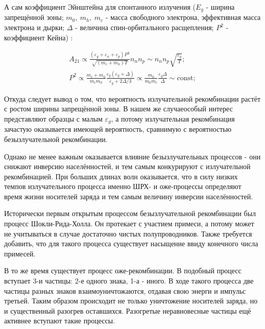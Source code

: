 \documentclass[../main.tex]{subfiles}
\begin{document}
    А сам коэффициент Эйнштейна для спонтанного излучения 
    ($E_g$ - ширина запрещённой зоны; $m_0,~m_h,~m_c$ - масса свободного электрона,
    эффективная масса электрона и дырки; $\Delta$ - величина спин-орбитального 
    расщепления; $P^2$ - коэффициент Кейна) \cite{Asryan:IOP:2005}: 

    \begin{equation*}
        \begin{array}{l}
            A_{21} \propto \frac{(\varepsilon_g + \varepsilon_n + \varepsilon_p) P^2}
                {\sqrt{(m_c + m_h)T}} n_n n_p \sim n_n n_p \sqrt{\frac{\varepsilon_g}{T}} ;\\
            P^2 \propto \frac{m_c + m_0}{m_c m_0} \frac{\varepsilon_g(\varepsilon_g + \Delta)}
                {\varepsilon_g + 2 \Delta / 3} \propto \frac{m_0}{m_0 m_c} \frac{\varepsilon_g \Delta}{\Delta} \sim \text{const};
        \end{array}
    \end{equation*} 

    Откуда следует вывод о том, что вероятность излучательной рекомбинации растёт
    с ростом ширины запрещённой зоны. В нашем же случаеособый интерес представляют
    образцы с малым $\varepsilon_g$, а потому излучательная рекомбинация зачастую оказывается
    имеющей вероятность, сравнимую с вероятностью безызлучательной рекомбинации.

    Однако не менее важным оказывается влияние безызлучательных процессов - они снижают
    инверсию населённостей, и тем самым конкурируют с излучательной рекомбинацией. При больших 
    длинах волн оказывается, что в силу низких темпов излучательного процесса именно ШРХ- и 
    оже-процессы определяют время жизни носителей заряда и тем самым величину инверсии населённостей.

    Исторически первым открытым процессом безызлучательной рекомбинации был процесс 
    Шокли-Рида-Холла. Он протекает с участием примеси, а потому может не учитываться 
    в случае достаточно чистых полупроводников. Также требуется добавить, что для такого процесса
    существует насыщение ввиду конечного числа примесей.

    В то же время существует процесс оже-рекомбинации. В подобный процесс вступает
    3-и частицы: 2-е одного знака, 1-а - иного. В ходе такого процесса две частицы разных знаков
    взаимоуничтожаются, отдавая свою энерги и импульс третьей. Таким образом происходит не только
    уничтожение носителей заряда, но и существенный разогрев оставшихся. Разогретые неравновесные 
    частицы ещё активнее вступают такие процессы.
\end{document}

